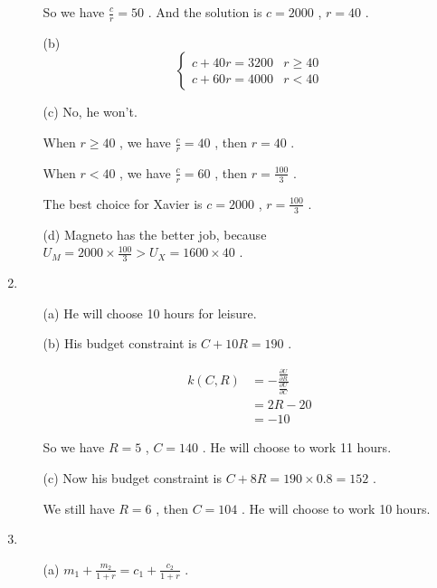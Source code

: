 \documentclass{article}
\begin{document}
\begin{enumerate}
\begin{enumerate}
        So we have $\frac{c}{r}=50$ . And the solution is $c=2000$ , $r=40$ .
        \item[(b)] \begin{equation}
            \begin{cases}
                c+40r=3200 & r\geq40 \\
                c+60r=4000 & r<40
            \end{cases}
            \nonumber
        \end{equation}
        \item[(c)] No, he won't. \par
        When $r\geq40$ , we have $\frac{c}{r}=40$ , then $r=40$ . \par
        When $r<40$ , we have $\frac{c}{r}=60$ , then $r=\frac{100}{3}$ . \par
        The best choice for Xavier is $c=2000$ , $r=\frac{100}{3}$ .
        \item[(d)] Magneto has the better job, because $U_M=2000\times\frac{100}{3}>U_X=1600\times40$ .
    \end{enumerate}
    \item \begin{enumerate}
        \item[(a)] He will choose 10 hours for leisure.
        \item[(b)] His budget constraint is $C+10R=190$ . \par
        \begin{equation}
            \begin{aligned}
                k(C,R)
                &=-\frac{\frac{\partial U}{\partial R}}{\frac{\partial U}{\partial C}} \\
                &=2R-20 \\
                &=-10
            \end{aligned}
            \nonumber
        \end{equation} \par
        So we have $R=5$ , $C=140$ . He will choose to work 11 hours.
        \item[(c)] Now his budget constraint is $C+8R=190\times0.8=152$ . \par
        We still have $R=6$ , then $C=104$ . He will choose to work 10 hours.
    \end{enumerate}
    \item \begin{enumerate}
        \item[(a)] $m_1+\frac{m_2}{1+r}=c_1+\frac{c_2}{1+r}$ .

\end{enumerate}
\end{enumerate}
\end{document}
